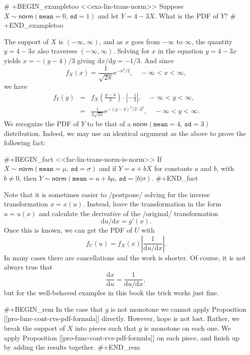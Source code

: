 # +BEGIN_exampletoo
<<exa-lin-trans-norm>> Suppose
\(X\sim\mathsf{norm}(\mathtt{mean}=0,\,\mathtt{sd}=1)\) and let
\(Y=4-3X\). What is the PDF of \(Y\)?
# +END_exampletoo


The support of \(X\) is \((-\infty,\infty)\), and as \(x\) goes from
\(-\infty\) to \(\infty\), the quantity \(y=4-3x\) also traverses
\((-\infty,\infty)\). Solving for \(x\) in the equation \(y=4-3x\)
yields \(x=-(y-4)/3\) giving \(\mathrm{d} x/\mathrm{d} y=-1/3\). And
since \[ f_{X}(x)=\frac{1}{\sqrt{2\pi}}\mathrm{e}^{-x^{2}/2}, \quad
-\infty < x < \infty , \] we have
\begin{eqnarray*}
f_{Y}(y) & = & f_{X}\left(\frac{y-4}{3}\right)\cdot\left|-\frac{1}{3}\right|,\quad -\infty < y < \infty,\\
 & = & \frac{1}{3\sqrt{2\pi}}\mathrm{e}^{-(y-4)^{2}/2\cdot3^{2}},\quad -\infty < y < \infty.
\end{eqnarray*}
We recognize the PDF of \(Y\) to be that of a
\(\mathsf{norm}(\mathtt{mean}=4,\,\mathtt{sd}=3)\)
distribution. Indeed, we may use an identical argument as the above to
prove the following fact:

#+BEGIN_fact
<<fac-lin-trans-norm-is-norm>> If
\(X\sim\mathsf{norm}(\mathtt{mean}=\mu,\,\mathtt{sd}=\sigma)\) and if
\(Y=a+bX\) for constants \(a\) and \(b\), with \(b\neq0\), then
\(Y\sim\mathsf{norm}(\mathtt{mean}=a+b\mu,\,\mathtt{sd}=|b|\sigma)\).
#+END_fact

Note that it is sometimes easier to /postpone/ solving for the inverse
transformation \(x=x(u)\). Instead, leave the transformation in the
form \(u=u(x)\) and calculate the derivative of the /original/
transformation
\begin{equation}
\mathrm{d} u/\mathrm{d} x=g'(x).
\end{equation}
Once this is known, we can get the PDF of \(U\) with
\begin{equation}
f_{U}(u)=f_{X}(x)\left|\frac{1}{\mathrm{d} u/\mathrm{d} x}\right|.
\end{equation}
In many cases there are cancellations and the work is shorter. Of course, it is not always true that
\begin{equation}
\label{eq-univ-jacob-recip}
\frac{\mathrm{d} x}{\mathrm{d} u}=\frac{1}{\mathrm{d} u/\mathrm{d} x},
\end{equation}
but for the well-behaved examples in this book the trick works just fine.

#+BEGIN_rem
In the case that \(g\) is not monotone we cannot apply Proposition
[[pro-func-cont-rvs-pdf-formula]] directly. However, hope is not
lost. Rather, we break the support of \(X\) into pieces such that
\(g\) is monotone on each one. We apply Proposition
[[pro-func-cont-rvs-pdf-formula]] on each piece, and finish up by
adding the results together.
#+END_rem

